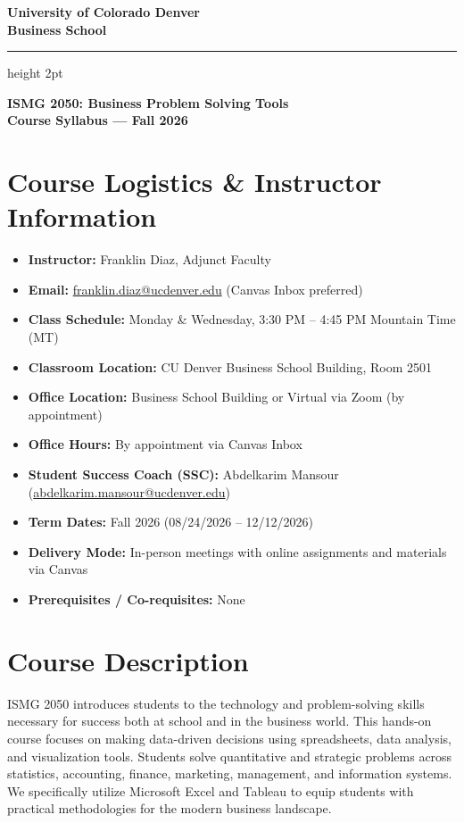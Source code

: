 \documentclass[11pt,a4paper]{article}
\begin{document}
\begin{center}
    {\LARGE \bfseries University of Colorado Denver} \\
    \vspace{2mm}
    {\Large \bfseries Business School} \\
    \vspace{4mm}
    {\color{cudenvergold}\hrule height 2pt}
    \vspace{3mm}
    {\large \bfseries ISMG 2050: Business Problem Solving Tools} \\
    {\large \bfseries Course Syllabus --- Fall 2026} \\
\end{center}

\vspace{0.5cm}

\section*{Course Logistics \& Instructor Information}
\begin{itemize}[leftmargin=*]
    \item \textbf{Instructor:} Franklin Diaz, Adjunct Faculty
    \item \textbf{Email:} \href{mailto:franklin.diaz@ucdenver.edu}{franklin.diaz@ucdenver.edu} (Canvas Inbox preferred)
    \item \textbf{Class Schedule:} Monday \& Wednesday, 3:30 PM -- 4:45 PM Mountain Time (MT)
    \item \textbf{Classroom Location:} CU Denver Business School Building, Room 2501
    \item \textbf{Office Location:} Business School Building or Virtual via Zoom (by appointment)
    \item \textbf{Office Hours:} By appointment via Canvas Inbox
    \item \textbf{Student Success Coach (SSC):} Abdelkarim Mansour (\href{mailto:abdelkarim.mansour@ucdenver.edu}{abdelkarim.mansour@ucdenver.edu})
    \item \textbf{Term Dates:} Fall 2026 (08/24/2026 -- 12/12/2026)
    \item \textbf{Delivery Mode:} In-person meetings with online assignments and materials via Canvas
    \item \textbf{Prerequisites / Co-requisites:} None
\end{itemize}

\section*{Course Description}
ISMG 2050 introduces students to the technology and problem-solving skills necessary for success both at school and in the business world. This hands-on course focuses on making data-driven decisions using spreadsheets, data analysis, and visualization tools. Students solve quantitative and strategic problems across statistics, accounting, finance, marketing, management, and information systems. We specifically utilize Microsoft Excel and Tableau to equip students with practical methodologies for the modern business landscape.
\end{document}
